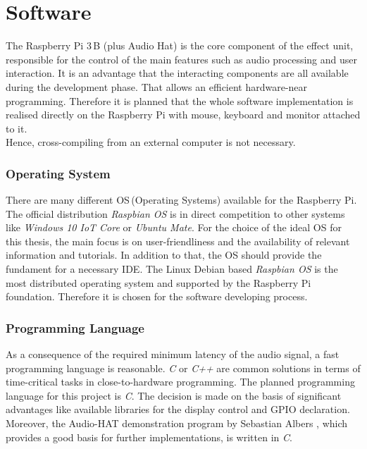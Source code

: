 \section{Software}

The Raspberry Pi 3\,B (plus Audio Hat) is the core component of the effect unit, responsible for the control of the main
features such as audio processing and user interaction.
It is an advantage that the interacting components are all available during the development phase.
That allows an efficient hardware-near programming. Therefore it is planned that the whole software implementation is realised directly on the Raspberry Pi with mouse, keyboard and monitor attached to it.\\
Hence, cross-compiling from an external computer is not necessary.

\subsubsection{Operating System}

There are many different OS\,(Operating Systems) available for the Raspberry Pi.
The official distribution \textit{Raspbian OS} is in direct competition to other systems like \textit{Windows 10 IoT Core} or \textit{Ubuntu Mate}.
For the choice of the ideal OS for this thesis, the main focus is on user-friendliness and the availability
of relevant information and tutorials. In addition to that, the OS should provide the fundament for a necessary IDE. The Linux Debian based \textit{Raspbian OS} is the most distributed operating system and supported by the Raspberry Pi foundation. Therefore it is chosen for the software developing process.

\subsubsection{Programming Language}

As a consequence of the required minimum latency of the audio signal, a fast programming language is reasonable. \textit{C} or \textit{C++} are common solutions in terms of time-critical tasks in close-to-hardware programming. The planned programming language for this project is \textit{C}. The decision is made on the basis of significant advantages like available libraries for the display control and GPIO declaration. Moreover, the Audio-HAT demonstration program by Sebastian Albers \cite{Albers:2017}, which provides a good basis for further implementations, is written in \textit{C}.


